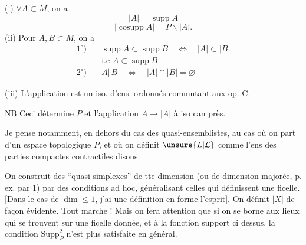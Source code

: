 (i) $\forall A\subset M$, on a
\[
|A|=\operatorname{supp}A
\]
\[
|\operatorname{cosupp}A|=P\smallsetminus|A|.
\]
(ii) Pour $A,B\subset M$, on a
\[
\begin{aligned}
1^{\circ})\quad&\operatorname{supp}A\subset\operatorname{supp}B\quad\Longleftrightarrow\quad|A|\subset|B|\\
&\text{i.e }A\subset\operatorname{supp}B\\[3pt]
2^{\circ})\quad&A\mathrel{\Vert}B\quad\Longleftrightarrow\quad|A|\cap|B|=\varnothing
\end{aligned}
\]

(iii) L'application
est  un iso. d'ens. ordonnés commutant aux op. $\mathrm{C}$.

\uline{NB} Ceci détermine $P$ et l'application $A\longrightarrow|A|$ à iso can près.

Je pense notamment, en dehors du cas des  quasi-ensemblistes, au cas où on part d'un espace topologique $P$, et où on définit $\unsure{L|\mathcal{L}}$  comme l'ens des parties compactes contractiles  disons.

On construit des ``quasi-simplexes'' de tte dimension  (ou de dimension  majorée, p. ex. par $1$) par des conditions ad hoc, généralisant celles qui définissent une  ficelle. [Dans le cas de $\dim\leq1$, j'ai  une définition en forme  l'esprit]. On définit $|X|$ de façon évidente. Tout marche ! Mais on fera attention que si on se borne aux lieux qui se trouvent sur une ficelle donnée, et à la fonction support ci dessus, la condition $\mathrm{Supp}_P^2$ n'est plus satisfaite en général.

